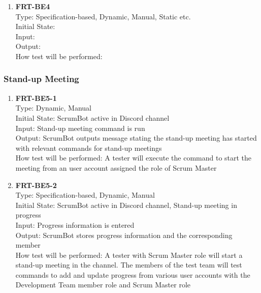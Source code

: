 \documentclass[12pt, titlepage]{article}
\begin{document}
\begin{enumerate}
    \item{\textbf{FRT-BE4}}\\
    Type: Specification-based, Dynamic, Manual, Static etc.\\
    Initial State: \\
    Input: \\
    Output: \\
    How test will be performed: \\
\end{enumerate}

\subsubsection{Stand-up Meeting}

\begin{enumerate}
    \item{\textbf{FRT-BE5-1}}\\
    Type: Dynamic, Manual\\
    Initial State: ScrumBot active in Discord channel\\
    Input: Stand-up meeting command is run\\
    Output: ScrumBot outputs message stating the stand-up meeting has started with relevant commands for stand-up meetings\\
    How test will be performed: A tester will execute the command to start the meeting from an user account assigned the role of Scrum Master\\
    
    \item{\textbf{FRT-BE5-2}}\\
    Type: Specification-based, Dynamic, Manual\\
    Initial State: ScrumBot active in Discord channel, Stand-up meeting in progress\\
    Input: Progress information is entered\\
    Output: ScrumBot stores progress information and the corresponding member\\
    How test will be performed: A tester with Scrum Master role will start a stand-up meeting in the channel. The members of the test team will test commands to add and update progress from various user accounts with the Development Team member role and Scrum Master role\\
\end{enumerate}
\end{document}
